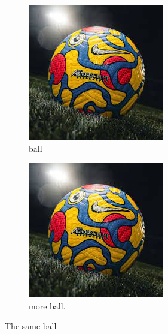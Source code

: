 \documentclass{article}
\begin{document}
	\begin{figure}[h!]
		\centering
		\begin{subfigure}[b]{0.2\linewidth}
				\includegraphics[width=\linewidth]{ball}
			\caption{ball}
		\end{subfigure}
	\begin{subfigure}[b]{0.4\linewidth}
		\includegraphics[width=\linewidth]{ball}
		\caption{more ball.}
	\end{subfigure}
\caption{The same ball}
\label{ball}
\end{figure}
\end{document}
